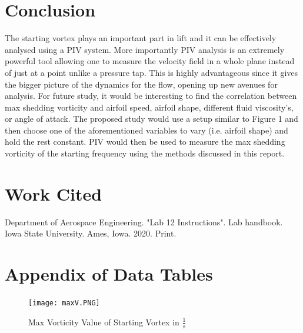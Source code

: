 \documentclass[12pt]{article}
\begin{document}
\newpage
\section{Conclusion}
The starting vortex plays an important part in lift and it can be effectively analysed using a PIV system. More importantly PIV analysis is an extremely powerful tool allowing one to measure the velocity field in a whole plane instead of just at a point unlike a pressure tap. This is highly advantageous since it gives the bigger picture of the dynamics for the flow, opening up new avenues for analysis.
\newline
\newline
For future study, it would be interesting to find the correlation between max shedding vorticity and airfoil speed, airfoil shape, different fluid viscosity's, or angle of attack. The proposed study would use a setup similar to Figure 1 and then choose one of the aforementioned variables to vary (i.e. airfoil shape) and hold the rest constant. PIV would then be used to measure the max shedding vorticity of the starting frequency using the methods discussed in this report.



\newpage
\section{Work Cited}
Department of Aerospace Engineering. "Lab 12 Instructions". Lab handbook. Iowa State University. Ames, Iowa. 2020. Print.
\newline
\newpage
\setcounter{section}{0}
\def\thesection{\Alph{section}}
\section{Appendix of Data Tables}
    \begin{figure}[h]
    \texttt{[image: maxV.PNG]}
    \centering
    \caption{Max Vorticity Value of Starting Vortex in \(\frac{1}{\mbox{s}}\)}
    \end{figure}
\end{document}
